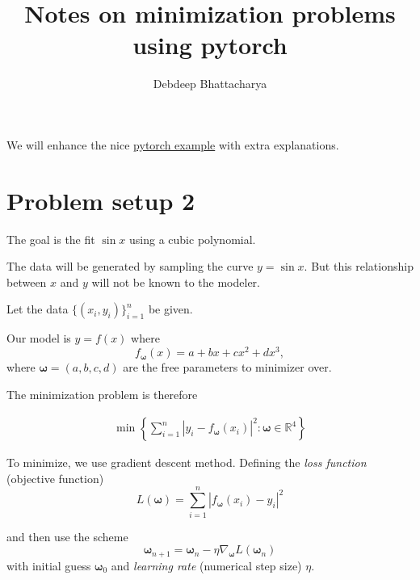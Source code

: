 \documentclass[
]{article}
\title{Notes on minimization problems using pytorch}
\author{Debdeep Bhattacharya}
\date{}
\newcommand{\1}{\boldsymbol{1}}
\begin{document}
\maketitle

We will enhance the nice
\href{https://pytorch.org/tutorials/beginner/pytorch_with_examples.html}{pytorch
example} with extra explanations.

\hypertarget{problem-setup-2}{%
\section{Problem setup 2}\label{problem-setup-2}}

The goal is the fit \(\sin x\) using a cubic polynomial.

The data will be generated by sampling the curve \(y = \sin x\). But
this relationship between \(x\) and \(y\) will not be known to the
modeler.

Let the data \(\{(x_i, y_i)\}_{i=1}^n\) be given.

Our model is \(y = f(x)\) where \[
f_{\boldsymbol{\omega}}(x) = a + bx + cx^2 + d x^3,
\] where \(\boldsymbol{\omega}= (a, b, c, d)\) are the free parameters
to minimizer over.

The minimization problem is therefore

\begin{align*}
\min \left\{\sum_{i=1}^{n} \left\lvert y_i - f_{\boldsymbol{\omega}}(x_i)\right\rvert^2: \boldsymbol{\omega}\in \mathbb{R}^4 \right\}
\end{align*}

To minimize, we use gradient descent method. Defining the \emph{loss
function} (objective function) \[
L(\boldsymbol{\omega}) = \sum_{i=1}^{n} \left\lvert f_{\boldsymbol{\omega}}(x_i) - y_i\right\rvert^2
\]

and then use the scheme \[
\boldsymbol{\omega}_{n+1} = \boldsymbol{\omega}_n - \eta \nabla_{\boldsymbol{\omega}} L(\boldsymbol{\omega}_n)
\] with initial guess \(\boldsymbol{\omega}_0\) and \emph{learning rate}
(numerical step size) \(\eta\).
\end{document}
